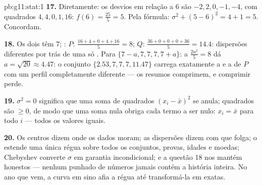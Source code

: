 \begin{solution}{pb:g11:stat:1}
\textbf{17.} Diretamente: os desvios em relação a $6$ são
$-2, 2, 0, -1, -4$, com quadrados $4, 4, 0, 1, 16$:
$f(6) = \frac{25}{5} = 5$. Pela fórmula:
$\sigma^2 + (5 - 6)^2 = 4 + 1 = 5$. Concordam.

\textbf{18.} Os dois têm  $7$; :
$P$: $\frac{16 + 4 + 0 + 4 + 16}{5} = 8$;
$Q$: $\frac{36 + 0 + 0 + 0 + 36}{5} = 14.4$: dispersões
diferentes por trás de uma só . Para
$\{7 - a, 7, 7, 7, 7 + a\}$: a 
$\frac{2a^2}{5} = 8$ dá $a = \sqrt{20} \approx 4.47$: o
conjunto $\{2.53, 7, 7, 7, 11.47\}$ carrega exatamente a 
e a  de $P$ com um perfil completamente diferente ---
os resumos comprimem, e comprimir perde.

\textbf{19.} $\sigma^2 = 0$ significa que uma soma de quadrados
$(x_i - \bar x)^2$ se anula; quadrados são $\geq 0$, de modo
que uma soma nula obriga cada termo a ser nulo:
$x_i = \bar x$ para todo $i$ --- todos os valores iguais.

\textbf{20.} Os centros dizem onde os dados moram; as
dispersões dizem com que folga; o  estende uma única
régua sobre todos os conjuntos, provas, idades e moedas;
Chebyshev converte $\sigma$ em garantia incondicional; e a
questão 18 nos mantém honestos --- nenhum punhado de números
jamais contém a história inteira. No ano que vem, a curva em
sino afia a régua até transformá-la em  exatas.
\end{solution}
